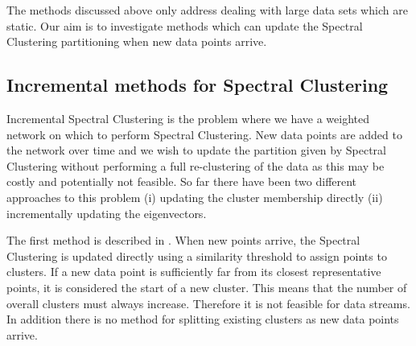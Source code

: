 The methods discussed above only address dealing with large data sets which are static. Our aim is to investigate methods which can update the Spectral Clustering partitioning when new data points arrive. 

\subsection{Incremental methods for Spectral Clustering}
 \label{sec:incremental}


Incremental Spectral Clustering is the problem where we have a weighted network on which to perform Spectral Clustering. New data points are added to the network over time and we wish to update the partition given by Spectral Clustering without performing a full re-clustering of the data as this may be costly and potentially not feasible.  So far there have been two different approaches to this problem (i) updating the cluster membership directly (ii) incrementally updating the eigenvectors.

The first method is described in \cite{Valgren2008}. When new points arrive, the Spectral Clustering is updated directly using a similarity threshold to assign points to clusters. If a new data point is sufficiently far from its closest representative points, it is considered the start of a new cluster. This means that the number of overall clusters  must always increase. Therefore it is not feasible for data streams. In addition there is no method for splitting existing clusters as new data points arrive. %

